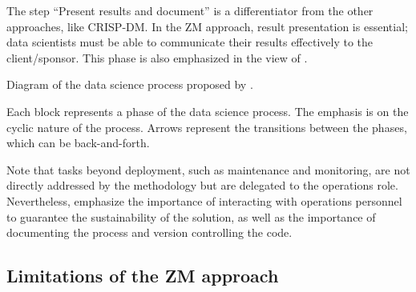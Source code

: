 The step ``Present results and document'' is a differentiator from the other approaches, like
CRISP-DM.  In the ZM approach, result presentation is essential; data scientists must be able
to communicate their results effectively to the client/sponsor.  This phase is also
emphasized in the view of \textcite{Wickham2023}.

\begin{figurebox}[label=fig:zumel]{Diagram of the data science process proposed by \textcite{Zumel2019}.}
  \centering

  \tcblower
  Each block represents a phase of the data science process.  The emphasis is on the
  cyclic nature of the process.  Arrows represent the transitions between the phases, which
  can be back-and-forth.
\end{figurebox}

Note that tasks beyond deployment, such as maintenance and monitoring, are not directly
addressed by the methodology but are delegated to the operations role.  Nevertheless,
\citeauthor{Zumel2019} emphasize the importance of interacting with operations personnel to
guarantee the sustainability of the solution, as well as the importance of documenting the
process and version controlling the code.

\subsection{Limitations of the ZM approach}

